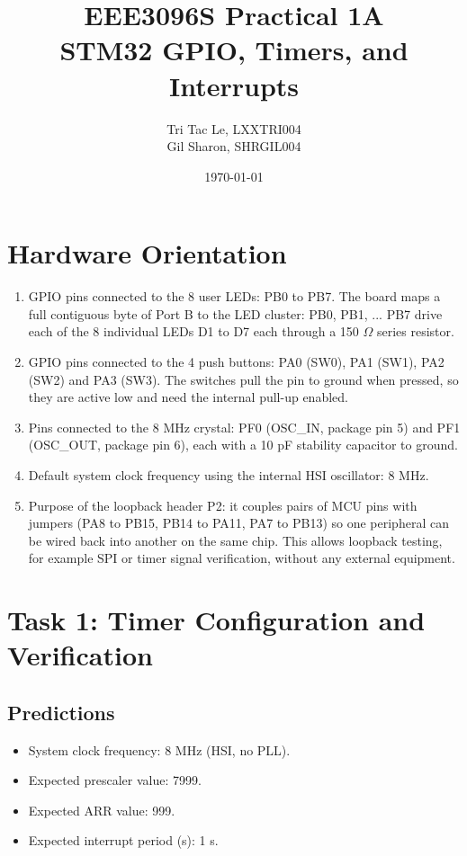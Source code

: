 \documentclass[11pt]{article}
\title{\textbf{EEE3096S Practical 1A} \\ STM32 GPIO, Timers, and Interrupts}
\author{Tri Tac Le, LXXTRI004 \\ Gil Sharon, SHRGIL004}
\date{\today}
\begin{document}
\maketitle

\section{Hardware Orientation}

\begin{enumerate}
    \item GPIO pins connected to the 8 user LEDs: PB0 to PB7. The board maps a full contiguous byte of Port B to the LED cluster: PB0, PB1, ... PB7 drive each of the 8 individual LEDs D1 to D7 each through a 150 $\Omega$ series resistor.
    \item GPIO pins connected to the 4 push buttons: PA0 (SW0), PA1 (SW1), PA2 (SW2) and PA3 (SW3). The switches pull the pin to ground when pressed, so they are active low and need the internal pull-up enabled.
    \item Pins connected to the 8 MHz crystal: PF0 (OSC\_IN, package pin 5) and PF1 (OSC\_OUT, package pin 6), each with a 10 pF stability capacitor to ground.
    \item Default system clock frequency using the internal HSI oscillator: 8 MHz.
    \item Purpose of the loopback header P2: it couples pairs of MCU pins with jumpers (PA8 to PB15, PB14 to PA11, PA7 to PB13) so one peripheral can be wired back into another on the same chip. This allows loopback testing, for example SPI or timer signal verification, without any external equipment.
\end{enumerate}

\section{Task 1: Timer Configuration and Verification}

\subsection{Predictions}

\begin{itemize}
    \item System clock frequency: 8 MHz (HSI, no PLL).
    \item Expected prescaler value: 7999.
    \item Expected ARR value: 999.
    \item Expected interrupt period (s): 1 s.
\end{itemize}
\end{document}

